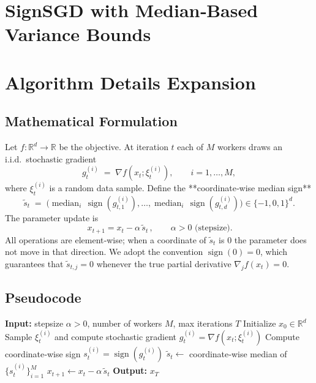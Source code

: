 \documentclass{article}
\newcommand{\sign}{\operatorname{sign}}
\newcommand{\R}{\mathbb{R}}
\begin{document}
\section*{SignSGD with Median‑Based Variance Bounds}

\section*{Algorithm Details Expansion}
\subsection*{Mathematical Formulation}
Let $f:\R^{d}\!\to\!\R$ be the objective.  
At iteration $t$ each of $M$ workers draws an i.i.d.\ stochastic gradient
\[
g^{(i)}_{t}\;=\;\nabla f(x_{t};\xi^{(i)}_{t}),\qquad i=1,\dots,M,
\]
where $\xi^{(i)}_{t}$ is a random data sample.  
Define the **coordinate‑wise median sign**
\[
\tilde{s}_{t}\;=\;\big(\operatorname{median}_{i}\,\sign(g^{(i)}_{t,1}),\dots,
\operatorname{median}_{i}\,\sign(g^{(i)}_{t,d})\big)\in\{-1,0,1\}^{d}.
\]
The parameter update is
\begin{equation}
\boxed{\,x_{t+1}=x_{t}-\alpha\,\tilde{s}_{t}\,},\qquad \alpha>0 \text{ (stepsize)}.
\label{eq:update}
\end{equation}
All operations are element‑wise; when a coordinate of $\tilde{s}_{t}$ is $0$ the
parameter does not move in that direction.  We adopt the convention
$\sign(0)=0$, which guarantees that $\tilde{s}_{t,j}=0$ whenever the true
partial derivative $\nabla_{j}f(x_{t})=0$.

\subsection*{Pseudocode}
\begin{algorithm}[H]
\caption{SignSGD with Median Aggregation}
\begin{algorithmic}[1]
\State \textbf{Input:} stepsize $\alpha>0$, number of workers $M$, max iterations $T$
\State Initialize $x_{0}\in\R^{d}$
        \State Sample $\xi^{(i)}_{t}$ and compute stochastic gradient $g^{(i)}_{t}
                =\nabla f(x_{t};\xi^{(i)}_{t})$
        \State Compute coordinate‑wise sign $s^{(i)}_{t}= \sign(g^{(i)}_{t})$
    \EndFor
    \State $\tilde{s}_{t}\gets$ coordinate‑wise median of $\{s^{(i)}_{t}\}_{i=1}^{M}$
    \State $x_{t+1}\gets x_{t}-\alpha\,\tilde{s}_{t}$ 
\EndFor
\State \textbf{Output:} $x_{T}$
\end{algorithmic}
\end{algorithm}
\end{document}
